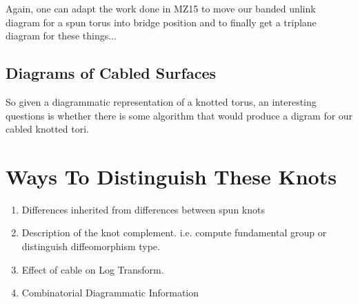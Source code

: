 \documentclass[a4paper, 12 pt, reqno]{amsart}
\theoremstyle{definition}
\theoremstyle{remark}
\begin{document}
Again, one can adapt the work done in MZ15 to move our banded unlink diagram for a spun torus into bridge position and to finally get a triplane diagram for these things... 

\subsection{Diagrams of Cabled Surfaces}

So given a diagrammatic representation of a knotted torus, an interesting questions is whether there is some algorithm that would produce a digram for our cabled knotted tori. 

\section{Ways To Distinguish These Knots}

\begin{enumerate}
\item Differences inherited from differences between spun knots
\item Description of the knot complement. i.e. compute fundamental group or distinguish diffeomorphism type.
\item Effect of cable on Log Transform. 
\item Combinatorial Diagrammatic Information
\end{enumerate}
\end{document}
